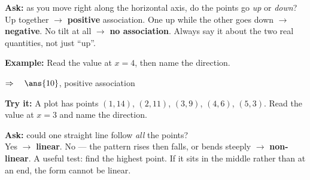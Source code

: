 \documentclass[12pt]{article}
\begin{document}


\begin{formulabox}
\textbf{Ask:} as you move right along the horizontal axis, do the points go \textit{up} or
\textit{down}?\\[3pt]
Up together $\rightarrow$ \textbf{positive} association. \quad One up while the other goes down
$\rightarrow$ \textbf{negative}. \quad No tilt at all $\rightarrow$ \textbf{no association}.
Always say it about the two real quantities, not just ``up''.
\end{formulabox}

\begin{examplebox}
\textbf{Example:} \quad Read the value at $x = 4$, then name the direction.
\begin{center}
\end{center}
$\Rightarrow\quad \ans{10}$, positive association
\end{examplebox}

\begin{tryitbox}
\textbf{Try it:} \quad A plot has points $(1,14)$, $(2,11)$, $(3,9)$, $(4,6)$, $(5,3)$. Read the
value at $x = 3$ and name the direction.\\[2pt]
\end{tryitbox}


\begin{formulabox}
\textbf{Ask:} could one straight line follow \textit{all} the points?\\[3pt]
Yes $\rightarrow$ \textbf{linear}. No --- the pattern rises then falls, or bends steeply
$\rightarrow$ \textbf{non-linear}. A useful test: find the highest point. If it sits in the middle
rather than at an end, the form cannot be linear.
\end{formulabox}
\end{document}
